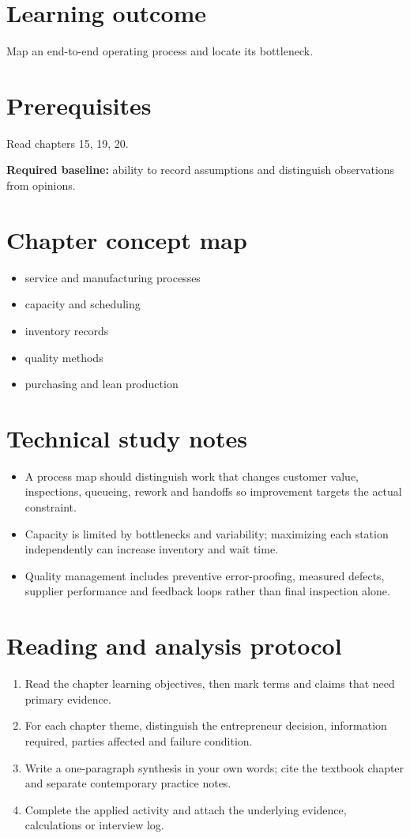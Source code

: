\documentclass[11pt,letterpaper]{article}
\begin{document}
\SuiteOpen
\section{Learning outcome}
Map an end-to-end operating process and locate its bottleneck.
\section{Prerequisites}
Read chapters 15, 19, 20.\par\textbf{Required baseline:} ability to record assumptions and distinguish observations from opinions.
\section{Chapter concept map}
\begin{itemize}[leftmargin=*,itemsep=3pt]
\item service and manufacturing processes
\item capacity and scheduling
\item inventory records
\item quality methods
\item purchasing and lean production
\end{itemize}

\section{Technical study notes}
\begin{itemize}[leftmargin=*,itemsep=3pt]
\item A process map should distinguish work that changes customer value, inspections, queueing, rework and handoffs so improvement targets the actual constraint.
\item Capacity is limited by bottlenecks and variability; maximizing each station independently can increase inventory and wait time.
\item Quality management includes preventive error-proofing, measured defects, supplier performance and feedback loops rather than final inspection alone.
\end{itemize}

\section{Reading and analysis protocol}
\begin{enumerate}[leftmargin=*,itemsep=5pt]
\item Read the chapter learning objectives, then mark terms and claims that need primary evidence.
\item For each chapter theme, distinguish the entrepreneur decision, information required, parties affected and failure condition.
\item Write a one-paragraph synthesis in your own words; cite the textbook chapter and separate contemporary practice notes.
\item Complete the applied activity and attach the underlying evidence, calculations or interview log.
\end{enumerate}
\end{document}
